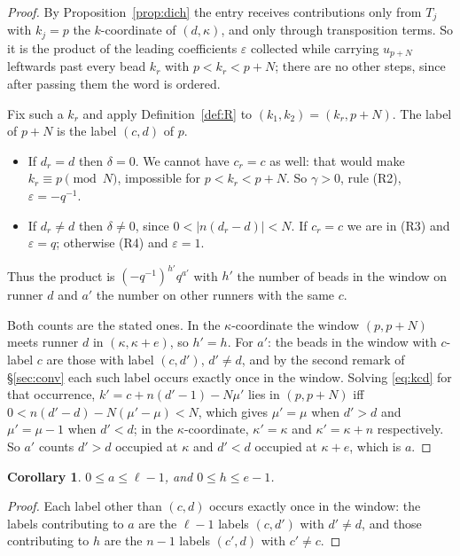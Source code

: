 \documentclass[11pt]{article}
\newtheorem{corollary}[theorem]{Corollary}
\theoremstyle{definition}
\theoremstyle{remark}
\begin{document}
\begin{proof}
By Proposition~\ref{prop:dich} the entry receives contributions only from $T_j$ with
$k_j=p$ the $k$-coordinate of $(d,\kappa)$, and only through transposition terms. So it
is the product of the leading coefficients $\varepsilon$ collected while carrying
$u_{p+N}$ leftwards past every bead $k_r$ with $p<k_r<p+N$; there are no other steps,
since after passing them the word is ordered.

Fix such a $k_r$ and apply Definition~\ref{def:R} to $(k_1,k_2)=(k_r,p+N)$. The label of
$p+N$ is the label $(c,d)$ of $p$.
\begin{itemize}
\item If $d_r=d$ then $\delta=0$. We cannot have $c_r=c$ as well: that would make
$k_r\equiv p \pmod N$, impossible for $p<k_r<p+N$. So $\gamma>0$, rule (R2),
$\varepsilon=-q^{-1}$.
\item If $d_r\neq d$ then $\delta\neq0$, since $0<|n(d_r-d)|<N$. If $c_r=c$ we are in
(R3) and $\varepsilon=q$; otherwise (R4) and $\varepsilon=1$.
\end{itemize}
Thus the product is $(-q^{-1})^{h'}q^{a'}$ with $h'$ the number of beads in the window on
runner $d$ and $a'$ the number on other runners with the same $c$.

Both counts are the stated ones. In the $\kappa$-coordinate the window
$(p,p+N)$ meets runner $d$ in $(\kappa,\kappa+e)$, so $h'=h$. For $a'$: the beads in the
window with $c$-label $c$ are those with label $(c,d')$, $d'\neq d$, and by the second
remark of \S\ref{sec:conv} each such label occurs exactly once in the window. Solving
\eqref{eq:kcd} for that occurrence, $k'=c+n(d'-1)-N\mu'$ lies in $(p,p+N)$ iff
$0<n(d'-d)-N(\mu'-\mu)<N$, which gives $\mu'=\mu$ when $d'>d$ and $\mu'=\mu-1$ when
$d'<d$; in the $\kappa$-coordinate, $\kappa'=\kappa$ and $\kappa'=\kappa+n$ respectively.
So $a'$ counts $d'>d$ occupied at $\kappa$ and $d'<d$ occupied at $\kappa+e$, which is
$a$.
\end{proof}

\begin{corollary}\label{cor:range}
$0\le a\le\ell-1$, and $0\le h\le e-1$.
\end{corollary}

\begin{proof}
Each label other than $(c,d)$ occurs exactly once in the window: the labels contributing
to $a$ are the $\ell-1$ labels $(c,d')$ with $d'\neq d$, and those contributing to $h$
are the $n-1$ labels $(c',d)$ with $c'\neq c$.
\end{proof}
\end{document}
